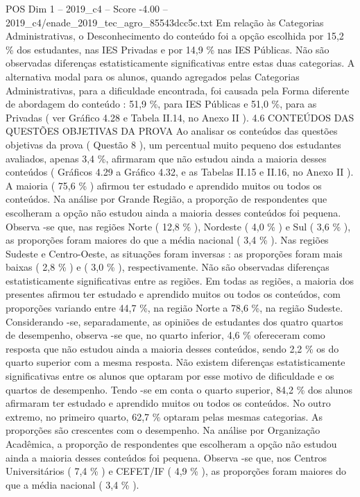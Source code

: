 \begin{textsample}{POS Dim 1 – 2019\_c4 – Score -4.00 – 2019\_c4/enade\_2019\_tec\_agro\_85543dcc5c.txt}
Em relação às Categorias Administrativas, o Desconhecimento do conteúdo foi a opção escolhida por 15,2 \% dos estudantes, nas IES Privadas e por 14,9 \% nas IES Públicas.
Não são observadas diferenças estatisticamente significativas entre estas duas categorias.
A alternativa modal para os alunos, quando agregados pelas Categorias Administrativas, para a dificuldade encontrada, foi causada pela Forma diferente de abordagem do conteúdo : 51,9 \%, para IES Públicas e 51,0 \%, para as Privadas ( ver Gráfico 4.28 e Tabela II.14, no Anexo II ). 4.6 CONTEÚDOS DAS QUESTÕES OBJETIVAS DA PROVA Ao analisar os conteúdos das questões objetivas da prova ( Questão 8 ), um percentual muito pequeno dos estudantes avaliados, apenas 3,4 \%, afirmaram que não estudou ainda a maioria desses conteúdos ( Gráficos 4.29 a Gráfico 4.32, e as Tabelas II.15 e II.16, no Anexo II ).
A maioria ( 75,6 \% ) afirmou ter estudado e aprendido muitos ou todos os conteúdos.
Na análise por Grande Região, a proporção de respondentes que escolheram a opção não estudou ainda a maioria desses conteúdos foi pequena.
Observa -se que, nas regiões Norte ( 12,8 \% ), Nordeste ( 4,0 \% ) e Sul ( 3,6 \% ), as proporções foram maiores do que a média nacional ( 3,4 \% ).
Nas regiões Sudeste e Centro-Oeste, as situações foram inversas : as proporções foram mais baixas ( 2,8 \% ) e ( 3,0 \% ), respectivamente.
Não são observadas diferenças estatisticamente significativas entre as regiões.
Em todas as regiões, a maioria dos presentes afirmou ter estudado e aprendido muitos ou todos os conteúdos, com proporções variando entre 44,7 \%, na região Norte a 78,6 \%, na região Sudeste.
Considerando -se, separadamente, as opiniões de estudantes dos quatro quartos de desempenho, observa -se que, no quarto inferior, 4,6 \% ofereceram como resposta que não estudou ainda a maioria desses conteúdos, sendo 2,2 \% os do quarto superior com a mesma resposta.
Não existem diferenças estatisticamente significativas entre os alunos que optaram por esse motivo de dificuldade e os quartos de desempenho.
Tendo -se em conta o quarto superior, 84,2 \% dos alunos afirmaram ter estudado e aprendido muitos ou todos os conteúdos.
No outro extremo, no primeiro quarto, 62,7 \% optaram pelas mesmas categorias.
As proporções são crescentes com o desempenho.
Na análise por Organização Acadêmica, a proporção de respondentes que escolheram a opção não estudou ainda a maioria desses conteúdos foi pequena.
Observa -se que, nos Centros Universitários ( 7,4 \% ) e CEFET/IF ( 4,9 \% ), as proporções foram maiores do que a média nacional ( 3,4 \% ).

\end{textsample}
